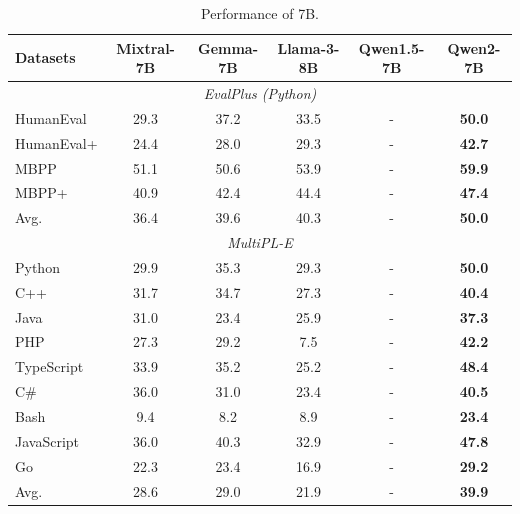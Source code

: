 \begin{table}[t]
\centering
\caption{Performance of 7B.}
\label{tab:code-7}
\begin{tabular}{@{}l|ccccc@{}}
\toprule
\textbf{Datasets} &\textbf{Mixtral-7B}   & \textbf{Gemma-7B} & \textbf{Llama-3-8B}  &\textbf{Qwen1.5-7B} & \textbf{Qwen2-7B} \\
\midrule
\multicolumn{6}{c}{\textit{EvalPlus (Python)}} \\
\midrule
HumanEval & 29.3  & 37.2  & 33.5 & - & \textbf{50.0} \\
HumanEval+ & 24.4  & 28.0 & 29.3 & -  & \textbf{42.7} \\
MBPP       & 51.1  & 50.6 & 53.9 & - & \textbf{59.9} \\
MBPP+     & 40.9  & 42.4 & 44.4 & - & \textbf{47.4} \\
\midrule
Avg. & 36.4 & 39.6 & 40.3 & - & \textbf{50.0} \\
\midrule
\multicolumn{6}{c}{\textit{MultiPL-E}} \\
\midrule
Python      & 29.9 &  35.3 & 29.3 & - & \textbf{50.0} \\
C++         & 31.7  & 34.7 & 27.3 &- & \textbf{40.4} \\
Java        & 31.0  & 23.4  & 25.9 & - & \textbf{37.3} \\
PHP         & 27.3 & 29.2 & 7.5 & - & \textbf{42.2} \\
TypeScript   & 33.9 &  35.2 & 25.2  & - & \textbf{48.4} \\
C\#          & 36.0  & 31.0 & 23.4  & - & \textbf{40.5} \\
Bash        & 9.4 & 8.2 & 8.9  & - & \textbf{23.4} \\
JavaScript  & 36.0  & 40.3 & 32.9 & - & \textbf{47.8} \\
Go          & 22.3  & 23.4  & 16.9 & - & \textbf{29.2} \\
\midrule
Avg.        & 28.6  & 29.0 & 21.9 & - & \textbf{39.9} \\
\bottomrule
\end{tabular}
\end{table}




